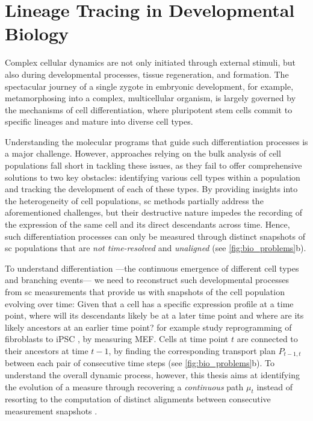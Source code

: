 \section{Lineage Tracing in Developmental Biology}
\label{sec:cell_differentiation}

Complex cellular dynamics are not only initiated through external stimuli, but also during developmental processes, tissue regeneration, and formation.
The spectacular journey of a single zygote in embryonic development, for example, metamorphosing into a complex, multicellular organism, is largely governed by the mechanisms of cell differentiation, where pluripotent stem cells commit to specific lineages and mature into diverse cell types.

Understanding the molecular programs that guide such differentiation processes is a major challenge.
However, approaches relying on the bulk analysis of cell populations fall short in tackling these issues, as they fail to offer comprehensive solutions to two key obstacles: identifying various cell types within a population and tracking the development of each of these types.
By providing insights into the heterogeneity of cell populations, \acrlong{sc} methods partially address the aforementioned challenges, but their destructive nature impedes the recording of the expression of the same cell and its direct descendants across time.
Hence, such differentiation processes can only be measured through distinct snapshots of \acrlong{sc} populations that are \textit{not time-resolved} and \textit{unaligned} (see \cref{fig:bio_problems}b).

To understand differentiation ---the continuous emergence of different cell types and branching events--- we need to reconstruct such developmental processes from \acrlong{sc} measurements that provide us with snapshots of the cell population evolving over time:
Given that a cell has a specific expression profile at a time point, where will its descendants likely be at a later time point and where are its likely ancestors at an earlier time point? 
\citet{schiebinger2019optimal} for example study reprogramming of fibroblasts to \acrfull{iPSC} \citep{takahashi2006induction}, by measuring \acrfull{MEF}. Cells at time point $t$ are connected to their ancestors at time $t-1$, by finding the corresponding transport plan $P_{t-1,t}$ between each pair of consecutive time steps (see \cref{fig:bio_problems}b).
To understand the overall dynamic process, however, this thesis aims at identifying the evolution of a measure through recovering a \emph{continuous} path $\mu_t$ instead of resorting to the computation of distinct alignments between consecutive measurement snapshots \citep{lavenant2021towards}.

